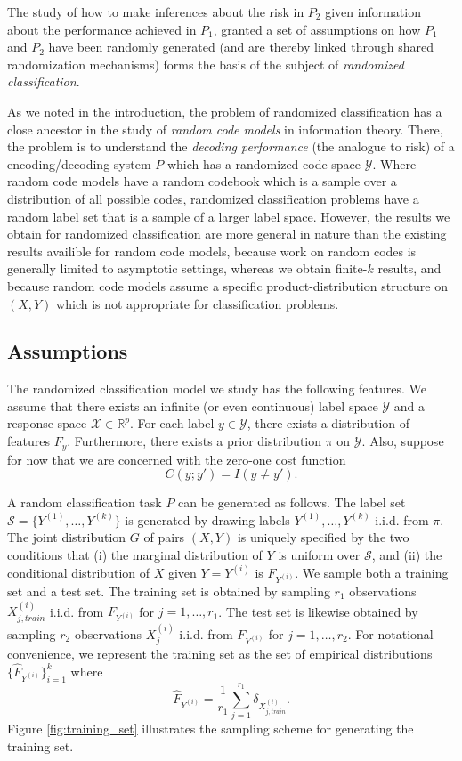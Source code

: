 The study of how to make inferences about the risk in $P_2$ given
information about the performance achieved in $P_1$, granted a set of
assumptions on how $P_1$ and $P_2$ have been randomly generated (and
are thereby linked through shared randomization mechanisms) forms the
basis of the subject of \emph{randomized classification}.

As we noted in the introduction, the problem of randomized
classification has a close ancestor in the study of \emph{random code
  models} in information theory.  There, the problem is to understand
the \emph{decoding performance} (the analogue to risk) of a
encoding/decoding system $P$ which has a randomized code space
$\mathcal{Y}$.  Where random code models have a random codebook which
is a sample over a distribution of all possible codes, randomized
classification problems have a random label set that is a sample of a
larger label space.  However, the results we obtain for randomized
classification are more general in nature than the existing results
availible for random code models, because work on random codes is
generally limited to asymptotic settings, whereas we obtain finite-$k$
results, and because random code models assume a specific
product-distribution structure on $(X, Y)$ which is not appropriate
for classification problems.

\subsection{Assumptions}

The randomized classification model we study has the following
features.  We assume that there exists an infinite (or even
continuous) label space $\mathcal{Y}$ and a response space
$\mathcal{X} \in \mathbb{R}^p$.  For each label $y \in \mathcal{Y}$,
there exists a distribution of features $F_y$.  Furthermore, there
exists a prior distribution $\pi$ on $\mathcal{Y}$.  Also, suppose for
now that we are concerned with the zero-one cost function
\[
C(y; y') = I(y \neq y').
\]

A random classification task $P$ can be generated as follows.  The
label set $\mathcal{S} = \{Y^{(1)},\hdots, Y^{(k)}\}$ is generated by
drawing labels $Y^{(1)},\hdots, Y^{(k)}$ i.i.d. from $\pi$.  The joint
distribution $G$ of pairs $(X, Y)$ is uniquely specified by the two
conditions that (i) the marginal distribution of $Y$ is uniform over
$\mathcal{S}$, and (ii) the conditional distribution of $X$ given
$Y=Y^{(i)}$ is $F_{Y^{(i)}}$.  We sample both a training set and a
test set.  The training set is obtained by sampling $r_1$
observations $X_{j, train}^{(i)}$ i.i.d. from $F_{Y^{(i)}}$ for $j =
1,\hdots, r_1$.  The test set is likewise obtained by sampling
$r_2$ observations $X_j^{(i)}$ i.i.d. from $F_{Y^{(i)}}$ for $j =
1,\hdots, r_2$.  For notational convenience, we represent the training
set as the set of empirical distributions
$\{\hat{F}_{Y^{(i)}}\}_{i=1}^k$ where
\[
\hat{F}_{Y^{(i)}} = \frac{1}{r_1} \sum_{j=1}^{r_1} \delta_{X^{(i)}_{j, train}}.
\]
Figure \ref{fig:training_set} illustrates the sampling scheme for
generating the training set.

